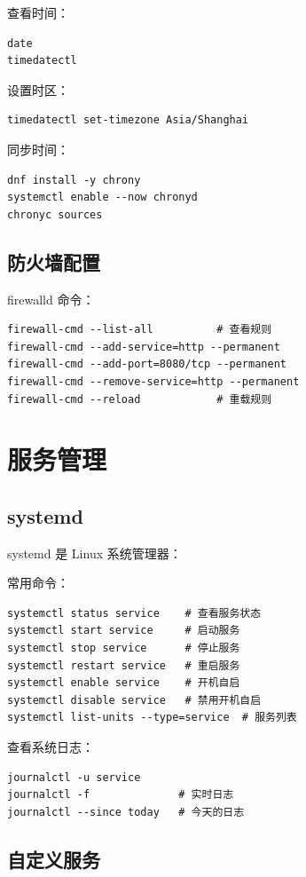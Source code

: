 \documentclass[12pt,UTF8]{ctexbook}
\begin{document}
查看时间：
\begin{verbatim}
date
timedatectl
\end{verbatim}

设置时区：
\begin{verbatim}
timedatectl set-timezone Asia/Shanghai
\end{verbatim}

同步时间：
\begin{verbatim}
dnf install -y chrony
systemctl enable --now chronyd
chronyc sources
\end{verbatim}

\section{防火墙配置}
\label{sec:firewall_config}

firewalld 命令：
\begin{verbatim}
firewall-cmd --list-all          # 查看规则
firewall-cmd --add-service=http --permanent
firewall-cmd --add-port=8080/tcp --permanent
firewall-cmd --remove-service=http --permanent
firewall-cmd --reload            # 重载规则
\end{verbatim}

\chapter{服务管理}
\label{chap:service_management}

\section{systemd}
\label{sec:systemd}

systemd 是 Linux 系统管理器：

常用命令：
\begin{verbatim}
systemctl status service    # 查看服务状态
systemctl start service     # 启动服务
systemctl stop service      # 停止服务
systemctl restart service   # 重启服务
systemctl enable service    # 开机自启
systemctl disable service   # 禁用开机自启
systemctl list-units --type=service  # 服务列表
\end{verbatim}

查看系统日志：
\begin{verbatim}
journalctl -u service
journalctl -f              # 实时日志
journalctl --since today   # 今天的日志
\end{verbatim}

\section{自定义服务}
\label{sec:custom_service}
\end{document}
